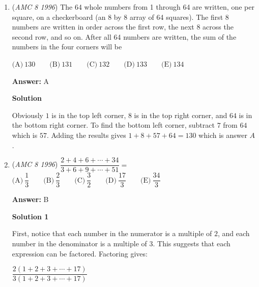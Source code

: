 \begin{enumerate}
 \textbf{Answer: }C



\textbf{Solution}

Jose gets $10 - 1 = 9$, then $9 \cdot 2 = 18$, then $18 + 2 = 20$.

 Thuy gets $10 \cdot 2 = 20$, then $20 - 1 = 19$, and then $19 + 2 = 21$.

 Kareem gets $10 - 1 = 9$, then $9 + 2 = 11$, and then $11\cdot 2 = 22$.

 Thus, Kareem gets the highest number, and the answer is $\boxed{C}$.

 


 


	\item (\textit{AMC 8 1996}) The 64 whole numbers from 1 through 64 are written, one per square, on a checkerboard (an 8 by 8 array of 64 squares).  The first 8 numbers are written in order across the first row, the next 8 across the second row, and so on.  After all 64 numbers are written, the sum of the numbers in the four corners will be


 $\text{(A)}\ 130 \qquad \text{(B)}\ 131 \qquad \text{(C)}\ 132 \qquad \text{(D)}\ 133 \qquad \text{(E)}\ 134$

 \textbf{Answer: }A



\textbf{Solution}

Obviously $1$ is in the top left corner, $8$ is in the top right corner, and $64$ is in the bottom right corner. To find the bottom left corner, subtract $7$ from $64$ which is $57$. Adding the results gives $1+8+57+64=130$ which is answer $\boxed{A}$.

 


	\item (\textit{AMC 8 1996}) $\dfrac{2+4+6+\cdots + 34}{3+6+9+\cdots+51}=$
$\text{(A)}\ \dfrac{1}{3} \qquad \text{(B)}\ \dfrac{2}{3} \qquad \text{(C)}\ \dfrac{3}{2} \qquad \text{(D)}\ \dfrac{17}{3} \qquad \text{(E)}\ \dfrac{34}{3}$

 \textbf{Answer: }B



\textbf{Solution 1}

First, notice that each number in the numerator is a multiple of $2$, and each number in the denominator is a multiple of $3$.  This suggests that each expression can be factored.  Factoring gives:

 $\dfrac{2(1+2+3+\cdots + 17)}{3(1+2+3+\cdots + 17)}$


\end{enumerate}

